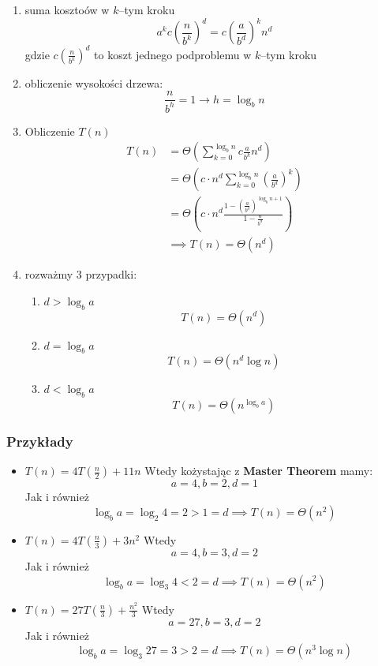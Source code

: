 \documentclass{article}
\begin{document}
\begin{enumerate}
    \item suma kosztoów w $k$--tym kroku
        \[
            a^k c (\frac{n}{b^k})^d = c (\frac{a}{b^d})^k n^d
        \]
        gdzie $c(\frac{n}{b^k})^d$ to koszt jednego podproblemu w $k$--tym kroku
    \item obliczenie wysokości drzewa:
        \[
            \frac{n}{b^h} = 1 \rightarrow h = \log_b n
        \]
    \item Obliczenie $T(n)$
    \begin{align*}
        T(n) &= \Theta\left(\sum^{\log_b n}_{k=0} c\frac{a}{b^k}n^d\right) \\
             &= \Theta\left(c \cdot n^d \sum^{\log_b n}_{k=0} \left(\frac{a}{b^d}\right)^k\right) \\
             &= \Theta\left(c \cdot n^d \frac{1-\left(\frac{a}{b^d}\right)^{\log_b n + 1}}{1-\frac{a}{b^d}}\right) \\
             &\implies T(n) = \Theta(n^d)
    \end{align*}
    
    \item rozważmy 3 przypadki:
        \begin{enumerate}
            \item $d > \log_b a$ 
                \[
                    T(n) = \Theta(n^d)
                \]
            \item $d = \log_b a$ 
                \[
                    T(n) = \Theta(n^d \log n)
                \]
            \item $d < \log_b a$
                \[
                    T(n) = \Theta(n^{\log_b a})
                \]
        \end{enumerate}
\end{enumerate}

\subsubsection*{Przykłady}
\begin{itemize}
    \item $T(n) = 4T(\frac{n}{2}) + 11n$ \newline
        Wtedy kożystając z \textbf{Master Theorem} mamy:
        \[
            a = 4, b = 2, d = 1
        \]
        Jak i również
        \[
            \log_b a = \log_2 4 = 2 > 1 = d \implies T(n) = \Theta(n^2)
        \]
    \item $T(n) = 4T(\frac{n}{3}) + 3n^2$ \newline
        Wtedy
        \[
            a = 4, b = 3, d = 2
        \]
        Jak i również
        \[
            \log_b a = \log_3 4 < 2 = d \implies T(n) = \Theta(n^2)
        \]
    \item $T(n) = 27T(\frac{n}{3}) + \frac{n^2}{3}$ \newline
        Wtedy
        \[
            a = 27, b = 3, d = 2
        \]
        Jak i również
        \[
            \log_b a = \log_3 27 = 3 > 2 = d \implies T(n) = \Theta(n^3\log n)
        \]
\end{itemize}
\end{document}
